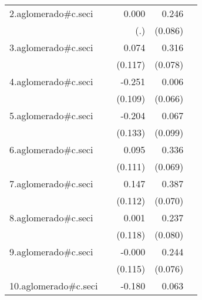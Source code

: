 {\begin{longtable}{l*{4}{D{.}{.}{-1}}}
\addlinespace
2.aglomerado#c.seci&                     &       0.000         &       0.246\sym{**} &                     \\
            &                     &         (.)         &     (0.086)         &                     \\
\addlinespace
3.aglomerado#c.seci&                     &       0.074         &       0.316\sym{***}&                     \\
            &                     &     (0.117)         &     (0.078)         &                     \\
\addlinespace
4.aglomerado#c.seci&                     &      -0.251\sym{*}  &       0.006         &                     \\
            &                     &     (0.109)         &     (0.066)         &                     \\
\addlinespace
5.aglomerado#c.seci&                     &      -0.204         &       0.067         &                     \\
            &                     &     (0.133)         &     (0.099)         &                     \\
\addlinespace
6.aglomerado#c.seci&                     &       0.095         &       0.336\sym{***}&                     \\
            &                     &     (0.111)         &     (0.069)         &                     \\
\addlinespace
7.aglomerado#c.seci&                     &       0.147         &       0.387\sym{***}&                     \\
            &                     &     (0.112)         &     (0.070)         &                     \\
\addlinespace
8.aglomerado#c.seci&                     &       0.001         &       0.237\sym{**} &                     \\
            &                     &     (0.118)         &     (0.080)         &                     \\
\addlinespace
9.aglomerado#c.seci&                     &      -0.000         &       0.244\sym{**} &                     \\
            &                     &     (0.115)         &     (0.076)         &                     \\
\addlinespace
10.aglomerado#c.seci&                     &      -0.180         &       0.063         &                     \\

\end{longtable}}
